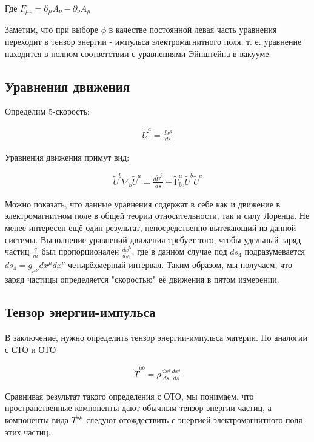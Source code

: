 \documentclass[a4paper,14pt]{article}
\begin{document}
	Где $ F_{\mu \nu} = \partial_{\mu} A_{\nu} - \partial_{\nu} A_{\mu} $

	Заметим, что при выборе $\phi$ в качестве постоянной левая часть уравнения переходит в тензор энергии - импульса электромагнитного поля, т. е. уравнение находится в полном соответствии с уравнениями Эйнштейна в вакууме.

\subsection*{Уравнения движения}

	Определим 5-скорость:

	\begin{align*}
	 	\tilde{U}^a = \frac{dx^a}{ds}
	\end{align*}

	Уравнения движения примут вид:

	\begin{align*}
	 \tilde{U}^b \nabla_b \tilde{U}^a = \frac{d \tilde{U}^a}{ds} + \tilde{Г}_{bc}^a \tilde{U}^b \tilde{U}^c
	\end{align*}

	Можно показать, что данные уравнения содержат в себе как и движение в электромагнитном поле в общей теории относительности, так и силу Лоренца. Не менее интересен ещё один результат, непосредственно вытекающий из данной системы. Выполнение уравнений движения требует того, чтобы удельный заряд частиц $ \frac{q}{m} $ был пропорционален $ \frac{dx^5}{ds_4} $, где в данном случае под $ ds_4 $ подразумевается $ ds_4 = g_{\mu \nu} dx^{\mu} dx^{\nu} $ четырёхмерный интервал. Таким образом, мы получаем, что заряд частицы определяется "скоростью" её движения в пятом измерении.


\subsection*{Тензор энергии-импульса}

	В заключение, нужно определить тензор энергии-импульса материи. По аналогии с СТО и ОТО 

	\begin{align*}
	 	\tilde{T}^{ab} = \rho \frac{dx^a}{ds} \frac{dx^b}{ds}
	\end{align*}

	Сравнивая результат такого определения с ОТО, мы понимаем, что пространственные компоненты дают обычным тензор энергии частиц, а компоненты вида $ T^{5 \mu} $ следуют отождествить с энергией электромагнитного поля этих частиц.
\end{document}
